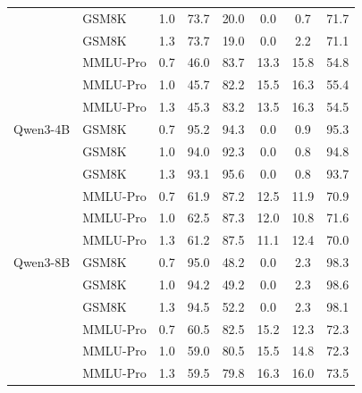 \begin{tabular}{llcccccc}
 & GSM8K & 1.0 & 73.7 & 20.0 & 0.0 & 0.7 & 71.7 \\
 & GSM8K & 1.3 & 73.7 & 19.0 & 0.0 & 2.2 & 71.1 \\
 & MMLU-Pro & 0.7 & 46.0 & 83.7 & 13.3 & 15.8 & 54.8 \\
 & MMLU-Pro & 1.0 & 45.7 & 82.2 & 15.5 & 16.3 & 55.4 \\
 & MMLU-Pro & 1.3 & 45.3 & 83.2 & 13.5 & 16.3 & 54.5 \\
\midrule
Qwen3-4B & GSM8K & 0.7 & 95.2 & 94.3 & 0.0 & 0.9 & 95.3 \\
 & GSM8K & 1.0 & 94.0 & 92.3 & 0.0 & 0.8 & 94.8 \\
 & GSM8K & 1.3 & 93.1 & 95.6 & 0.0 & 0.8 & 93.7 \\
 & MMLU-Pro & 0.7 & 61.9 & 87.2 & 12.5 & 11.9 & 70.9 \\
 & MMLU-Pro & 1.0 & 62.5 & 87.3 & 12.0 & 10.8 & 71.6 \\
 & MMLU-Pro & 1.3 & 61.2 & 87.5 & 11.1 & 12.4 & 70.0 \\
\midrule
Qwen3-8B & GSM8K & 0.7 & 95.0 & 48.2 & 0.0 & 2.3 & 98.3 \\
 & GSM8K & 1.0 & 94.2 & 49.2 & 0.0 & 2.3 & 98.6 \\
 & GSM8K & 1.3 & 94.5 & 52.2 & 0.0 & 2.3 & 98.1 \\
 & MMLU-Pro & 0.7 & 60.5 & 82.5 & 15.2 & 12.3 & 72.3 \\
 & MMLU-Pro & 1.0 & 59.0 & 80.5 & 15.5 & 14.8 & 72.3 \\
 & MMLU-Pro & 1.3 & 59.5 & 79.8 & 16.3 & 16.0 & 73.5 \\
\bottomrule
\end{tabular}
